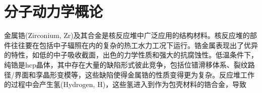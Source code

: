 \chapter{分子动力学概论}\label{chapter:MD}
金属锆\textrm{(Zirconium, Zr)}及其合金是核反应堆中广泛应用的结构材料。核反应堆的部件往往要在包括中子辐照在内的复杂的热工水力工况下运行。锆金属表现出了优异的特性，如低的中子吸收截面，出色的力学性质和强大的抗腐蚀性。低温条件下，纯锆是\textrm{hcp}晶体，其中存在大量的缺陷形式彼此竞争，包括位错滑移体系、裂纹路径/界面和孪晶形变模等，这些缺陷使得金属锆的性质变得更为复杂。反应堆工作的过程中会产生氢\textrm{(Hydrogen, H)}，这些氢进入到作为包壳材料的锆合金，导致

